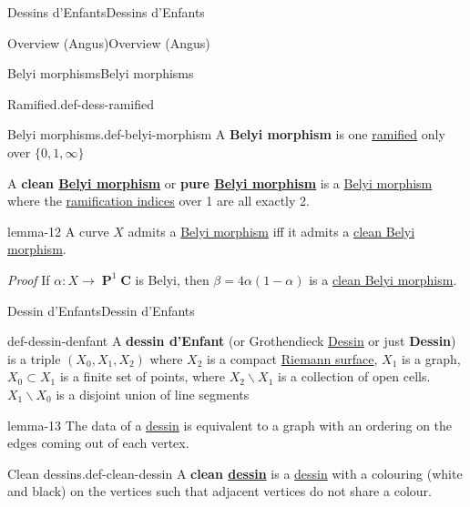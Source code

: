 \documentclass[10pt,]{book}
\makeatletter
\newcommand{\terminology}[1]{\textbf{#1}}
\renewcommand*{\proofname}{Proof}
\renewenvironment{proof}[1][\proofname]{\par
  \pushQED{\qed}%
  \normalfont \topsep6\p@\@plus6\p@\relax
  \trivlist
  \item\relax
    {\itshape
    #1\@addpunct{.}}\hspace\labelsep\ignorespaces
}{%
  \popQED\endtrivlist\@endpefalse
}
\numberwithin{equation}{section}
\newcommand{\CC}{\mathbf{C}}
\DeclareMathOperator{\PP}{\mathbf{P}}
\makeatother
\begin{document}
\begin{chapterptx}{Dessins d'Enfants}{}{Dessins d'Enfants}{}{}
\begin{sectionptx}{Overview (Angus)}{}{Overview (Angus)}{}{}
\begin{subsectionptx}{Belyi morphisms}{}{Belyi morphisms}{}{}
\begin{definition}{Ramified.}{def-dess-ramified}
\end{definition}
\begin{definition}{Belyi morphisms.}{def-belyi-morphism}%
\hypertarget{p-461}{}%
A \terminology{Belyi morphism} is one \hyperref[def-dess-ramified]{ramified} only over \(\{0,1,\infty\}\)%
\par
\hypertarget{p-462}{}%
A \terminology{clean \hyperref[def-belyi-morphism]{Belyi morphism}} or \terminology{pure \hyperref[def-belyi-morphism]{Belyi morphism}} is a \hyperref[def-belyi-morphism]{Belyi morphism} where the \hyperref[def-dess-ramified]{ramification indices} over 1 are all exactly 2.%
\end{definition}
\begin{lemma}{}{}{lemma-12}%
\hypertarget{p-463}{}%
A curve \(X\) admits a \hyperref[def-belyi-morphism]{Belyi morphism} iff it admits a \hyperref[def-belyi-morphism]{clean Belyi morphism}.%
\end{lemma}
\begin{proof}\hypertarget{proof-80}{}
\hypertarget{p-464}{}%
If \(\alpha \colon X\to \PP^1 \CC\) is Belyi, then \(\beta = 4\alpha(1-\alpha)\) is a \hyperref[def-belyi-morphism]{clean Belyi morphism}.%
\end{proof}
\end{subsectionptx}
%
%
\typeout{************************************************}
\typeout{************************************************}
%
\begin{subsectionptx}{Dessin d'Enfants}{}{Dessin d'Enfants}{}{}\label{subsection-40}
\begin{definition}{}{def-dessin-denfant}%
\hypertarget{p-465}{}%
A \terminology{dessin d'Enfant} (or Grothendieck \hyperref[def-dessin-denfant]{Dessin} or just \terminology{Dessin}) is a triple \((X_0,X_1,X_2)\) where \(X_2\) is a compact \hyperref[def-top-riem-surface]{Riemann surface}, \(X_1\) is a graph, \(X_0 \subset X_1\) is a finite set of points, where \(X_2 \smallsetminus X_1\) is a collection of open cells. \(X_1 \smallsetminus X_0\) is a disjoint union of line segments%
\end{definition}
\begin{lemma}{}{}{lemma-13}%
\hypertarget{p-466}{}%
The data of a \hyperref[def-dessin-denfant]{dessin} is equivalent to a graph with an ordering on the edges coming out of each vertex.%
\end{lemma}
\begin{definition}{Clean dessins.}{def-clean-dessin}%
\hypertarget{p-467}{}%
A \terminology{clean \hyperref[def-dessin-denfant]{dessin}} is a \hyperref[def-dessin-denfant]{dessin} with a colouring (white and black) on the vertices such that adjacent vertices do not share a colour.%

\end{definition}
\end{subsectionptx}
\end{sectionptx}
\end{chapterptx}
\end{document}
